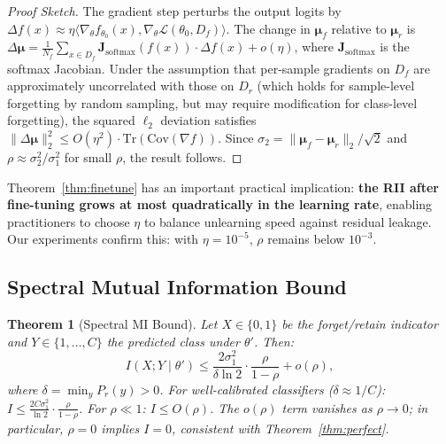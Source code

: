 \documentclass[journal]{IEEEtran}
\newtheorem{theorem}{Theorem}[section]
\theoremstyle{definition}
\begin{document}
\begin{proof}[Proof Sketch]
The gradient step perturbs the output logits by $\Delta f(x) \approx \eta \langle \nabla_\theta f_{\theta_0}(x), \nabla_\theta \mathcal{L}(\theta_0, D_f)\rangle$. The change in $\boldsymbol{\mu}_f$ relative to $\boldsymbol{\mu}_r$ is $\Delta\boldsymbol{\mu} = \frac{1}{N_f}\sum_{x\in D_f} \mathbf{J}_{\mathrm{softmax}}(f(x)) \cdot \Delta f(x) + o(\eta)$, where $\mathbf{J}_{\mathrm{softmax}}$ is the softmax Jacobian. Under the assumption that per-sample gradients on $D_f$ are approximately uncorrelated with those on $D_r$ (which holds for sample-level forgetting by random sampling, but may require modification for class-level forgetting), the squared $\ell_2$ deviation satisfies $\|\Delta\boldsymbol{\mu}\|_2^2 \le O(\eta^2) \cdot \mathrm{Tr}(\mathrm{Cov}(\nabla f))$. Since $\sigma_2 = \|\boldsymbol{\mu}_f - \boldsymbol{\mu}_r\|_2 / \sqrt{2}$ and $\rho \approx \sigma_2^2/\sigma_1^2$ for small $\rho$, the result follows.
\end{proof}

Theorem~\ref{thm:finetune} has an important practical implication: \textbf{the RII after fine-tuning grows at most quadratically in the learning rate}, enabling practitioners to choose $\eta$ to balance unlearning speed against residual leakage. Our experiments confirm this: with $\eta=10^{-5}$, $\rho$ remains below $10^{-3}$.

\subsection{Spectral Mutual Information Bound}

\begin{theorem}[Spectral MI Bound]
\label{thm:mi_bound}
Let $X \in \{0,1\}$ be the forget/retain indicator and $Y \in \{1,\dots,C\}$ the predicted class under $\theta'$. Then:
\begin{equation}
\boxed{I(X; Y \mid \theta') \le \frac{2\sigma_1^2}{\delta\ln 2}\cdot\frac{\rho}{1-\rho} + o(\rho),}
\label{eq:mi_bound}
\end{equation}
where $\delta = \min_y P_r(y) > 0$. For well-calibrated classifiers ($\delta \approx 1/C$): $I \le \frac{2C\sigma_1^2}{\ln 2}\cdot\frac{\rho}{1-\rho}$. For $\rho \ll 1$: $I \le O(\rho)$. The $o(\rho)$ term vanishes as $\rho \to 0$; in particular, $\rho=0$ implies $I=0$, consistent with Theorem~\ref{thm:perfect}.
\end{theorem}
\end{document}
